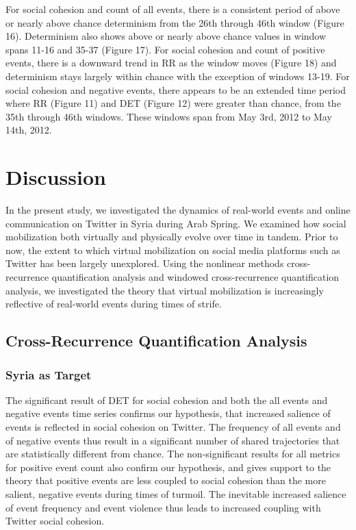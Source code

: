 \documentclass[english,man]{apa6}
\begin{document}
For social cohesion and count of all events, there is a consistent period of above or nearly above chance determinism from the 26th through 46th window (Figure 16). Determinism also shows above or nearly above chance values in window spans 11-16 and 35-37 (Figure 17). For social cohesion and count of positive events, there is a downward trend in RR as the window moves (Figure 18) and determinism stays largely within chance with the exception of windows 13-19. For social cohesion and negative events, there appears to be an extended time period where RR (Figure 11) and DET (Figure 12) were greater than chance, from the 35th through 46th windows. These windows span from May 3rd, 2012 to May 14th, 2012.

\hypertarget{discussion}{%
\section{Discussion}\label{discussion}}

In the present study, we investigated the dynamics of real-world events and online communication on Twitter in Syria during Arab Spring. We examined how social mobilization both virtually and physically evolve over time in tandem. Prior to now, the extent to which virtual mobilization on social media platforms such as Twitter has been largely unexplored. Using the nonlinear methods cross-recurrence quantification analysis and windowed cross-recurrence quantification analysis, we investigated the theory that virtual mobilization is increasingly reflective of real-world events during times of strife.

\hypertarget{cross-recurrence-quantification-analysis-2}{%
\subsection{Cross-Recurrence Quantification Analysis}\label{cross-recurrence-quantification-analysis-2}}

\hypertarget{syria-as-target-2}{%
\subsubsection{Syria as Target}\label{syria-as-target-2}}

The significant result of DET for social cohesion and both the all events and negative events time series confirms our hypothesis, that increased salience of events is reflected in social cohesion on Twitter. The frequency of all events and of negative events thus result in a significant number of shared trajectories that are statistically different from chance. The non-significant results for all metrics for positive event count also confirm our hypothesis, and gives support to the theory that positive events are less coupled to social cohesion than the more salient, negative events during times of turmoil. The inevitable increased salience of event frequency and event violence thus leads to increased coupling with Twitter social cohesion.
\end{document}
